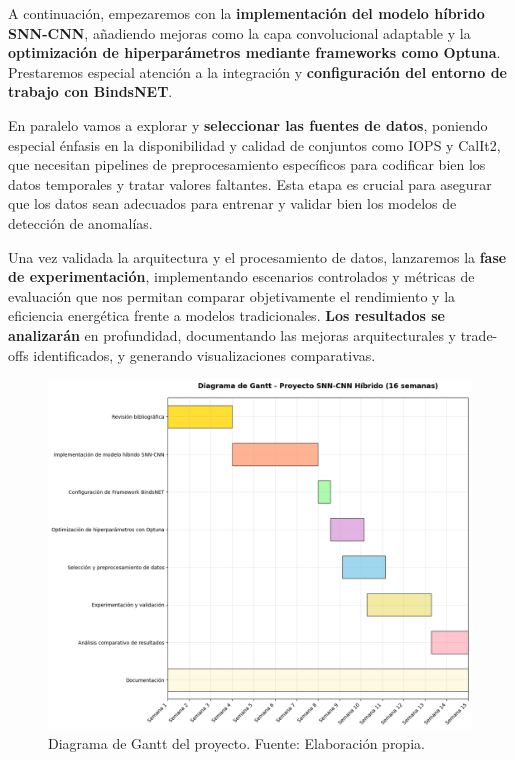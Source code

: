 A continuación, empezaremos con la \textbf{implementación del modelo híbrido SNN-CNN}, añadiendo mejoras como la capa convolucional adaptable y la \textbf{optimización de hiperparámetros mediante frameworks como Optuna}. Prestaremos especial atención a la integración y \textbf{configuración del entorno de trabajo con BindsNET}.

En paralelo vamos a explorar y \textbf{seleccionar las fuentes de datos}, poniendo especial énfasis en la disponibilidad y calidad de conjuntos como IOPS y CalIt2, que necesitan pipelines de preprocesamiento específicos para codificar bien los datos temporales y tratar valores faltantes. Esta etapa es crucial para asegurar que los datos sean adecuados para entrenar y validar bien los modelos de detección de anomalías.

Una vez validada la arquitectura y el procesamiento de datos, lanzaremos la \textbf{fase de experimentación}, implementando escenarios controlados y métricas de evaluación que nos permitan comparar objetivamente el rendimiento y la eficiencia energética frente a modelos tradicionales. \textbf{Los resultados se analizarán} en profundidad, documentando las mejoras arquitecturales y trade-offs identificados, y generando visualizaciones comparativas.

\begin{figure}[p] %
    \centering
    \includegraphics[width=\paperwidth,height=\paperheight,keepaspectratio,angle=90]{Imagenes/Gantt.png}
    \caption{Diagrama de Gantt del proyecto. Fuente: Elaboración propia.}
    \label{fig:Diagrama de Gantt}
\end{figure}